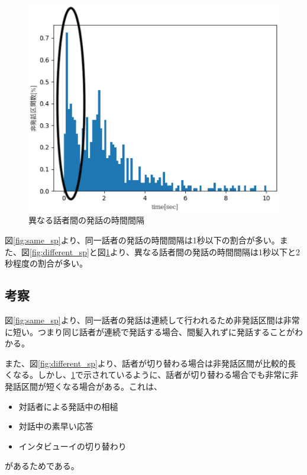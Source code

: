 \begin{figure}[H]
  \begin{center}
    \includegraphics{./figure/pre_other1.eps}
  \end{center}
  \caption{異なる話者間の発話の時間間隔 \label{fig:different_sp2}}
\end{figure}

図\ref{fig:same_sp}より、同一話者の発話の時間間隔は1秒以下の割合が多い。また、図\ref{fig:different_sp}と図\ref{fig:different_sp2}より、異なる話者間の発話の時間間隔は1秒以下と2秒程度の割合が多い。

\subsection{考察}
図\ref{fig:same_sp}より、同一話者の発話は連続して行われるため非発話区間は非常に短い。つまり同じ話者が連続で発話する場合、間髪入れずに発話することがわかる。\par
また、図\ref{fig:different_sp}より、話者が切り替わる場合は非発話区間が比較的長くなる。しかし、\ref{fig:different_sp2}で示されているように、話者が切り替わる場合でも非常に非発話区間が短くなる場合がある。これは、

\begin{itemize}
\item 対話者による発話中の相槌
\item 対話中の素早い応答
\item インタビューイの切り替わり
\end{itemize}

があるためである。
